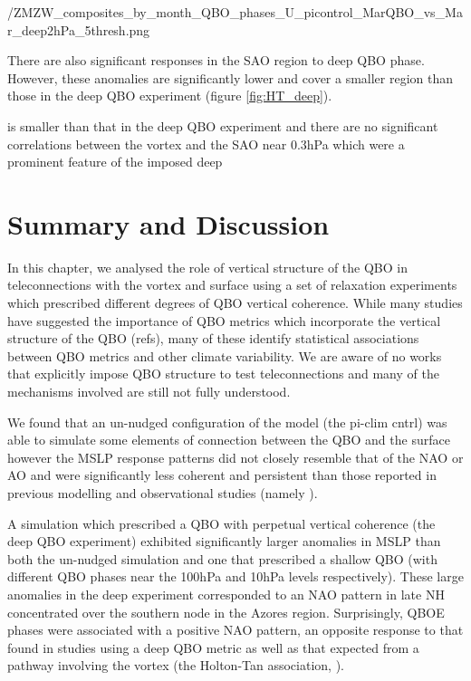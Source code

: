 /ZMZW_composites_by_month_QBO_phases_U_picontrol_MarQBO_vs_Mar_deep2hPa_5thresh.png

There are also significant responses in the SAO region to deep QBO phase. However, these anomalies are significantly lower and cover a smaller region than those in the deep QBO experiment (figure \ref{fig:HT_deep}). 

is smaller than that in the deep QBO experiment and there are no significant correlations between the vortex and the SAO near 0.3hPa which were a prominent feature of the imposed deep

\section{Summary and Discussion}
In this chapter, we analysed the role of vertical structure of the QBO in teleconnections with the vortex and surface using a set of relaxation experiments which prescribed different degrees of QBO vertical coherence. While many studies have suggested the importance of QBO metrics which incorporate the vertical structure of the QBO (refs), many of these identify statistical associations between QBO metrics and other climate variability. We are aware of no works that explicitly impose QBO structure to test teleconnections and many of the mechanisms involved are still not fully understood. 

We found that an un-nudged configuration of the model (the pi-clim cntrl) was able to simulate some elements of connection between the QBO and the surface however the MSLP response patterns did not closely resemble that of the NAO or AO and were significantly less coherent and persistent than those reported in previous modelling and observational studies (namely \cite{Andrews2020}).

A simulation which prescribed a QBO with perpetual vertical coherence (the deep QBO experiment) exhibited significantly larger anomalies in MSLP than both the un-nudged simulation and one that prescribed a shallow QBO (with different QBO phases near the 100hPa and 10hPa levels respectively). These large anomalies in the deep experiment corresponded to an NAO pattern in late NH concentrated over the southern node in the Azores region. Surprisingly, QBOE phases were associated with a positive NAO pattern, an opposite response to that found in studies using a deep QBO metric \citep{Andrews2020} as well as that expected from a pathway involving the vortex (the Holton-Tan association, \cite{holtonNumerical1980}).

